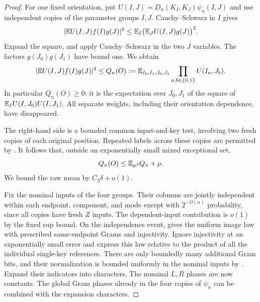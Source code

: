 \begin{proof}
For one fixed orientation, put
$U(I,J)=D_n(K_I,K_J)\psi_n(I,J)$ and use independent copies of the
parameter groups $I,J$. Cauchy--Schwarz in $I$ gives
\[
 \lvert \mathbb E U(I,J)f(I)g(J)\rvert^2
 \le\mathbb E_I\bigl(\mathbb E_JU(I,J)g(J)\bigr)^2.
\]
Expand the square, and apply Cauchy--Schwarz in the two $J$ variables.
The factors $g(J_0)g(J_1)$ have bound one. We obtain
\begin{equation}\label{eq:product-four-corner}
 \lvert \mathbb E U(I,J)f(I)g(J)\rvert^4
 \le Q_n(O):=
 \mathbb E_{I_0,I_1,J_0,J_1}
       \prod_{a,b\in\{0,1\}}U(I_a,J_b).
\end{equation}
In particular $Q_n(O)\ge0$: it is the expectation over $J_0,J_1$ of
the square of $\mathbb E_IU(I,J_0)U(I,J_1)$. All separate weights, including
their orientation dependence, have disappeared.

The right-hand side is a bounded common input-and-key test, involving
two fresh copies of each original position. Repeated labels across
these copies are permitted by . It follows that,
outside an exponentially small mixed exceptional set,
\begin{equation}\label{eq:product-four-corner-typical}
 Q_n(O)\le\mathbb E_{\mu^2}Q_n+\rho.
\end{equation}
We bound the raw mean by $C_3\delta+o(1)$.

Fix the nominal inputs of the four groups. Their columns are jointly
independent within each endpoint, component, and mode except with
$2^{-\Omega(n)}$ probability, since all copies have fresh $Z$ inputs.
The dependent-input contribution is $o(1)$ by the fixed sup bound.
On the independence event,  gives the uniform
image law with prescribed same-endpoint Grams and injectivity.
Ignore injectivity at an exponentially small error and express this
law relative to the product of all the individual single-key
references. There are only boundedly many additional Gram bits, and
their normalization is bounded uniformly in the nominal inputs by
. Expand their indicators into
characters. The nominal $L,R$ phases are now constants. The global
Gram phases already in the four copies of $\psi_n$ can be combined
with the expansion characters.


\end{proof}
